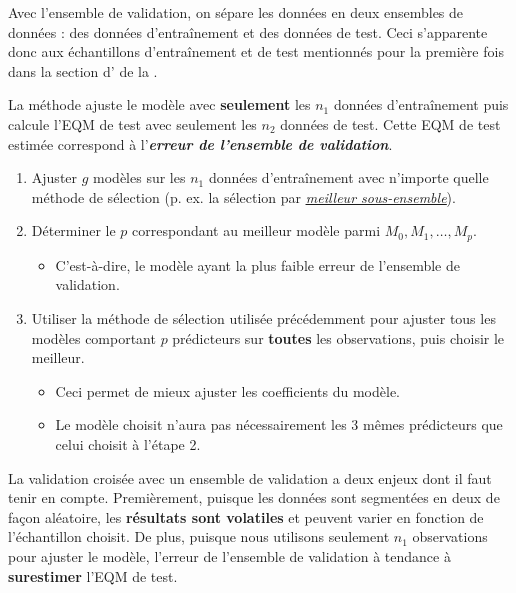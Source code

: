 \documentclass[french]{article}
\begin{document}
\begin{multicols*}{2}
\begin{rappel_enhanced}[Contexte]
Avec l'ensemble de validation, on sépare les données en deux ensembles de données : des données d'entraînement et des données de test. Ceci s'apparente donc aux échantillons d'entraînement et de test mentionnés pour la première fois dans la section d'\textit{\underline{}} de la \textit{\underline{}}. 

\bigskip

La méthode ajuste le modèle avec \textbf{seulement} les $n_{1}$ données d'entraînement puis calcule l'EQM de test avec seulement les $n_{2}$ données de test. Cette EQM de test estimée correspond à l'\textbf{\textit{erreur de l'ensemble de validation}}.
\end{rappel_enhanced}

\begin{algo2}
\begin{enumerate}[label = \circled{\arabic*}{trueblue}]
	\item	Ajuster $g$ modèles sur les $n_{1}$ données d'entraînement avec n'importe quelle méthode de sélection (p. ex. la sélection par \textit{\color{bleudefrance}\underline{\hyperlink{bestSubset}{\color{bleudefrance} meilleur sous-ensemble}}}).
	\item	Déterminer le $p$ correspondant au meilleur modèle parmi $M_{0}, M_{1}, \dots, M_{p}$.
		\begin{itemize}
		\item	C'est-à-dire, le modèle ayant la plus faible erreur de l'ensemble de validation.
		\end{itemize}
	\item	Utiliser la méthode de sélection utilisée précédemment pour ajuster tous les modèles comportant $p$ prédicteurs sur \textbf{toutes} les observations, puis choisir le meilleur.
		\begin{itemize}
		\item	Ceci permet de mieux ajuster les coefficients du modèle.
		\item	Le modèle choisit n'aura pas nécessairement les 3 mêmes prédicteurs que celui choisit à l'étape 2.
		\end{itemize}
\end{enumerate}
\end{algo2}

\begin{rappel_enhanced}[Limitations]
La validation croisée avec un ensemble de validation a deux enjeux dont il faut tenir en compte. Premièrement, puisque les données sont segmentées en deux de façon aléatoire, les \textbf{résultats sont volatiles} et peuvent varier en fonction de l'échantillon choisit. De plus, puisque nous utilisons seulement $n_{1}$ observations pour ajuster le modèle, l'erreur de l'ensemble de validation à tendance à \textbf{surestimer} l'EQM de test. 
\end{rappel_enhanced}




\end{multicols*}
\end{document}
